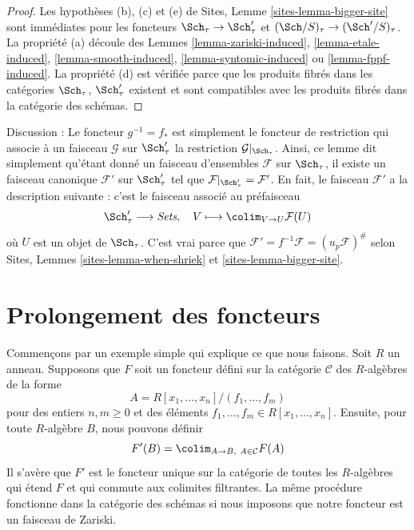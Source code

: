 \begin{proof}
Les hypothèses (b), (c) et (e) de Sites, Lemme \ref{sites-lemma-bigger-site} sont immédiates pour les foncteurs $\Sch_\tau \to \Sch'_\tau$ et $(\Sch/S)_\tau \to (\Sch'/S)_\tau$. La propriété (a) découle des Lemmes \ref{lemma-zariski-induced}, \ref{lemma-etale-induced}, \ref{lemma-smooth-induced}, \ref{lemma-syntomic-induced} ou \ref{lemma-fppf-induced}. La propriété (d) est vérifiée parce que les produits fibrés dans les catégories $\Sch_\tau$, $\Sch'_\tau$ existent et sont compatibles avec les produits fibrés dans la catégorie des schémas.
\end{proof}

\noindent
Discussion : Le foncteur $g^{-1} = f_*$ est simplement le foncteur de restriction qui associe à un faisceau $\mathcal{G}$ sur $\Sch'_\tau$ la restriction $\mathcal{G}|_{\Sch_\tau}$. Ainsi, ce lemme dit simplement qu'étant donné un faisceau d'ensembles $\mathcal{F}$ sur $\Sch_\tau$, il existe un faisceau canonique $\mathcal{F}'$ sur $\Sch'_\tau$ tel que $\mathcal{F}|_{\Sch'_\tau} = \mathcal{F}'$. En fait, le faisceau $\mathcal{F}'$ a la description suivante : c'est le faisceau associé au préfaisceau
$$
\Sch'_\tau \longrightarrow \textit{Sets}, \quad
V \longmapsto \colim_{V \to U} \mathcal{F}(U)
$$
où $U$ est un objet de $\Sch_\tau$. C'est vrai parce que $\mathcal{F}' = f^{-1}\mathcal{F} = (u_p\mathcal{F})^\#$ selon Sites, Lemmes \ref{sites-lemma-when-shriek} et \ref{sites-lemma-bigger-site}.






\section{Prolongement des foncteurs}
\label{section-extending-functors}

\noindent
Commençons par un exemple simple qui explique ce que nous faisons. Soit $R$ un anneau. Supposons que $F$ soit un foncteur défini sur la catégorie $\mathcal{C}$ des $R$-algèbres de la forme
$$
A = R[x_1, \ldots, x_n]/(f_1, \ldots, f_m)
$$
pour des entiers $n, m \geq 0$ et des éléments $f_1, \ldots, f_m \in R[x_1, \ldots, x_n]$. Ensuite, pour toute $R$-algèbre $B$, nous pouvons définir
$$
F'(B) = \colim_{A \to B,\ A \in \mathcal{C}} F(A)
$$
Il s'avère que $F'$ est le foncteur unique sur la catégorie de toutes les $R$-algèbres qui étend $F$ et qui commute aux colimites filtrantes. La même procédure fonctionne dans la catégorie des schémas si nous imposons que notre foncteur est un faisceau de Zariski.

